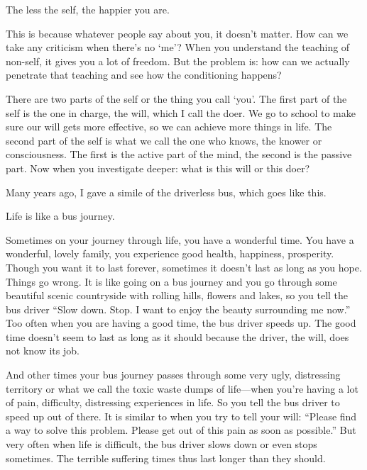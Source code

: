 \documentclass[12pt, openany]{book}
\newenvironment{aphorism}%
{%
\begin{center}\begin{itshape}
}%
{\end{itshape}\end{center}
}%
\begin{document}
\begin{aphorism}
The less the self, the happier you are.
\end{aphorism}

This is because whatever people say about you, it doesn’t matter. How can we take any criticism when there’s no ‘me’? When you understand the teaching of non-self, it gives you a lot of freedom. But the problem is: how can we actually penetrate that teaching and see how the conditioning happens? 

There are two parts of the self or the thing you call ‘you’. The first part of the self is the one in charge, the will, which I call the doer. We go to school to make sure our will gets more effective, so we can achieve more things in life. The second part of the self is what we call the one who knows, the knower or consciousness. The first is the active part of the mind, the second is the passive part. Now when you investigate deeper: what is this will or this doer? 

Many years ago, I gave a simile of the driverless bus, which goes like this. 

\begin{aphorism}
Life is like a bus journey.
\end{aphorism}

Sometimes on your journey through life, you have a wonderful time. You have a wonderful, lovely family, you experience good health, happiness, prosperity. Though you want it to last forever, sometimes it doesn’t last as long as you hope. Things go wrong. It is like going on a bus journey and you go through some beautiful scenic countryside with rolling hills, flowers and lakes, so you tell the bus driver “Slow down. Stop. I want to enjoy the beauty surrounding me now.” Too often when you are having a good time, the bus driver speeds up. The good time doesn’t seem to last as long as it should because the driver, the will, does not know its job. 

And other times your bus journey passes through some very ugly, distressing territory or what we call the toxic waste dumps of life—when you’re having a lot of pain, difficulty, distressing experiences in life. So you tell the bus driver to speed up out of there. It is similar to when you try to tell your will: “Please find a way to solve this problem. Please get out of this pain as soon as possible.” But very often when life is difficult, the bus driver slows down or even stops sometimes. The terrible suffering times thus last longer than they should. 
\end{document}
